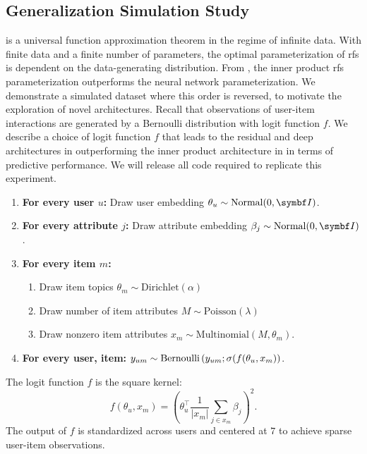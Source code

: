 \subsection{Generalization Simulation Study}
\label{sec:simulation}
 is a universal function approximation theorem in the regime of infinite data. With finite data and a finite number of parameters, the optimal parameterization of \gls{rfs} is dependent on the data-generating distribution. From , the inner product \gls{rfs} parameterization outperforms the neural network parameterization. We demonstrate a simulated dataset where this order is reversed, to motivate the exploration of novel architectures. Recall that observations of user-item interactions are generated by a Bernoulli distribution with logit function $f$. We describe a choice of logit function $f$ that leads to the residual and deep architectures in  outperforming the inner product architecture in  in terms of predictive performance. We will release all code required to replicate this experiment.
\begin{enumerate}
  \item \textbf{For every user $u$:} Draw user embedding $\theta_u \sim \textrm{Normal}(0, \mbI)$.
  \item \textbf{For every attribute $j$:} Draw attribute embedding $\beta_j \sim \textrm{Normal}(0, \mbI)$.
  \item \textbf{For every item $m$:}
    \begin{enumerate}
    \item Draw item topics $\theta_m \sim \textrm{Dirichlet}(\alpha)$
    \item Draw number of item attributes $M \sim \textrm{Poisson}(\lambda)$
    \item Draw nonzero item attributes $x_m \sim \textrm{Multinomial}(M, \theta_m)$.
    \end{enumerate}
  \item \textbf{For every user, item:} $y_{um} \sim \textrm{Bernoulli}\left(y_{um}; \sigma(f(\theta_u, x_m)\right)$.
\end{enumerate}
The logit function $f$ is the square kernel:
$$f(\theta_u, x_m) = \left(\theta_u^\top \frac{1}{|x_m|}\sum_{j \in x_m}
  \beta_j\right)^2.$$
The output of $f$ is standardized across users and centered at $7$ to achieve sparse user-item observations.

